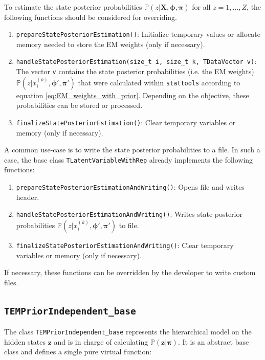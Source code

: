 \documentclass[a4paper,11pt]{article}
\def\X{\boldsymbol{X}}
\def\z{\boldsymbol{z}}
\def\bpi{\boldsymbol{\pi}}
\def\bphi{\boldsymbol{\phi}}
\def\p{\mathbb{P}}
\def\stattools{\texttt{stattools}}
\newcommand{\class}[1]{\texttt{#1}}
\newcommand{\func}[1]{\texttt{#1}}
\newcommand{\pubfunc}[1]{\texttt{#1()}}
\newcommand{\variable}[1]{\texttt{#1}}
\begin{document}
To estimate the state posterior probabilities $\p(z | \X, \bphi, \bpi)$ for all $z=1, \ldots, Z$, the following functions should be considered for overriding.

\begin{enumerate}
 \item \pubfunc{prepareStatePosteriorEstimation}: Initialize temporary values or allocate memory needed to store the EM weights (only if necessary).
 \item \func{handleStatePosteriorEstimation(size\_t i, size\_t k, TDataVector v)}: The vector \variable{v} contains the state posterior probabilities (i.e. the EM weights) $\p(z | x_i^{(k)}, \bphi', \bpi')$ that were calculated within \stattools{} according to equation \eqref{eq:EM_weights_with_prior}. Depending on the objective, these probabilities can be stored or processed.
 \item \pubfunc{finalizeStatePosteriorEstimation}: Clear temporary variables or memory (only if necessary).
\end{enumerate}

A common use-case is to write the state posterior probabilities to a file. In such a case, the base class \class{TLatentVariableWithRep} already implements the following functions:

\begin{enumerate}
 \item \pubfunc{prepareStatePosteriorEstimationAndWriting}: Opens file and writes header.
 \item \pubfunc{handleStatePosteriorEstimationAndWriting}: Writes state posterior probabilities $\p(z | x_i^{(k)}, \bphi', \bpi')$ to file.
 \item \pubfunc{finalizeStatePosteriorEstimationAndWriting}: Clear temporary variables or memory (only if necessary).
\end{enumerate}

If necessary, these functions can be overridden by the developer to write custom files.

\subsection{\class{TEMPriorIndependent\_base}}

The class \class{TEMPriorIndependent\_base} represents the hierarchical model on the hidden states $\z$ and is in charge of calculating $\p(\z | \bpi)$. It is an abstract base class and defines a single pure virtual function:
\end{document}
